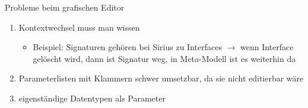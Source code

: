 \begin{frame}{Probleme beim grafischen Editor}
	\begin{enumerate}
		\item Kontextwechsel muss man wissen
		\begin{itemize}
			\item Beispiel: Signaturen gehören bei Sirius zu Interfaces $\rightarrow$ wenn Interface gelöscht wird, dann ist Signatur weg, in Meta-Modell ist es weiterhin da
		\end{itemize}
		\item Parameterlisten mit Klammern schwer umsetzbar, da sie nicht editierbar wäre
		\item eigenständige Datentypen als Parameter
	\end{enumerate}
\end{frame}